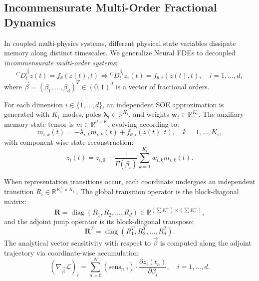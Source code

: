 \documentclass[11pt,a4paper]{article}
\theoremstyle{plain}
\theoremstyle{definition}
\newcommand{\R}{\mathbb{R}}
\newcommand{\cD}{{}^C D}
\newcommand{\diag}{\operatorname{diag}}
\begin{document}
\subsection{Incommensurate Multi-Order Fractional Dynamics}
\label{subsec:incommensurate}
In coupled multi-physics systems, different physical state variables dissipate memory along distinct timescales. We generalize Neural FDEs to decoupled \emph{incommensurate multi-order systems}:
\begin{equation}
    \cD_t^{\vec{\beta}} z(t) = f_\theta(z(t), t) \iff \cD_t^{\beta_i} z_i(t) = f_{\theta, i}(z(t), t), \quad i = 1, \dots, d,
    \label{eq:incommensurate_def}
\end{equation}
where $\vec{\beta} = (\beta_1, \dots, \beta_d)^T \in (0, 1)^d$ is a vector of fractional orders.

For each dimension $i \in \{1, \dots, d\}$, an independent SOE approximation is generated with $K_i$ modes, poles $\bm{\lambda}_i \in \R^{K_i}$, and weights $\bm{w}_i \in \R^{K_i}$. The auxiliary memory state tensor is $m \in \R^{d \times K}$, evolving according to:
\begin{equation}
    \dot{m}_{i, k}(t) = -\lambda_{i, k} m_{i, k}(t) + f_{\theta, i}(z(t), t), \quad k = 1, \dots, K_i,
\end{equation}
with component-wise state reconstruction:
\begin{equation}
    z_i(t) = z_{i, 0} + \frac{1}{\Gamma(\beta_i)} \sum_{k=1}^{K_i} w_{i, k} m_{i, k}(t).
\end{equation}

When representation transitions occur, each coordinate undergoes an independent transition $R_i \in \R^{K_i^+ \times K_i^-}$. The global transition operator is the block-diagonal matrix:
\begin{equation}
    \mathbf{R} = \diag(R_1, R_2, \dots, R_d) \in \R^{(\sum K_i^+) \times (\sum K_i^-)},
\end{equation}
and the adjoint jump operator is its block-diagonal transpose:
\begin{equation}
    \mathbf{R}^T = \diag(R_1^T, R_2^T, \dots, R_d^T).
\end{equation}
The analytical vector sensitivity with respect to $\vec{\beta}$ is computed along the adjoint trajectory via coordinate-wise accumulation:
\begin{equation}
    \left( \nabla_{\vec{\beta}} \mathcal{L} \right)_i = \sum_{n=0}^N \left( \text{sens}_{n, i} \right) \cdot \frac{\partial z_i(t_n)}{\partial \beta_i}, \quad i = 1, \dots, d.
\end{equation}
\end{document}
